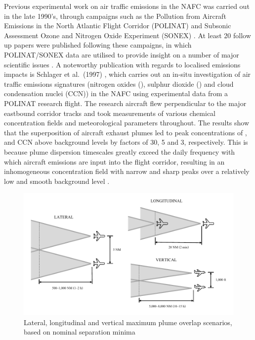 Previous experimental work on air traffic emissions in the NAFC was carried out in the late 1990's, through campaigns such as the Pollution from Aircraft Emissions in the North Atlantic Flight Corridor (POLINAT) and Subsonic Assessment Ozone and Nitrogen Oxide Experiment (SONEX) \cite{Schumann2000}. At least 20 follow up papers were published following these campaigns, in which POLINAT/SONEX data are utilised to provide insight on a number of major scientific issues \cite{Thompson2000}. A noteworthy publication with regards to localised emissions impacts is Schlager et al.\ (1997) \cite{Schlager1997}, which carries out an in-situ investigation of air traffic emissions signatures (nitrogen oxides (), sulphur dioxide () and cloud condensation nuclei (CCN)) in the NAFC using experimental data from a POLINAT research flight. The research aircraft flew perpendicular to the major eastbound corridor tracks and took measurements of various chemical concentration fields and meteorological parameters throughout. The results show that the superposition of aircraft exhaust plumes led to peak concentrations of ,  and CCN above background levels by factors of 30, 5 and 3, respectively. This is because plume dispersion timescales greatly exceed the daily frequency with which aircraft emissions are input into the flight corridor, resulting in an inhomogeneous concentration field with narrow and sharp peaks over a relatively low and smooth background level \cite{Schumann2000}.

\begin{figure}[H]
  \centering
  \includegraphics[width=0.9\linewidth]{cap_example.pdf}
  \caption{Lateral, longitudinal and vertical maximum plume overlap scenarios, based on nominal separation minima \cite{ICAOPANSDoc44442016}}
  \label{cap_example} 
\end{figure}

